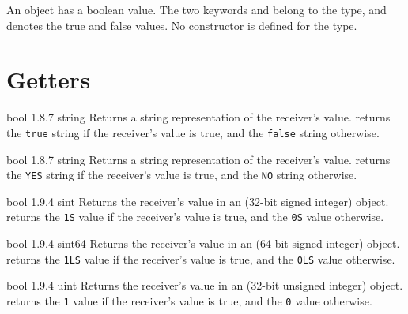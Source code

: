 

An  object has a boolean value. The two keywords  and  belong to the  type, and denotes the true and false values. No constructor is defined for the  type.

\section{Getters}

{bool}
{1.8.7}
{string}
{Returns a string representation of the receiver's value.}
{returns the \texttt{\textquotedbl true\textquotedbl} string if the receiver's value is true, and the \texttt{\textquotedbl false\textquotedbl} string otherwise.}







{bool}
{1.8.7}
{string}
{Returns a string representation of the receiver's value.}
{returns the \texttt{\textquotedbl YES\textquotedbl} string if the receiver's value is true, and the \texttt{\textquotedbl NO\textquotedbl} string otherwise.}




{bool}
{1.9.4}
{sint}
{Returns the receiver's value in an  (32-bit signed integer) object.}
{returns the \texttt{1S}  value if the receiver's value is true, and the \texttt{0S}  value otherwise.}




{bool}
{1.9.4}
{sint64}
{Returns the receiver's value in an  (64-bit signed integer) object.}
{returns the \texttt{1LS}  value if the receiver's value is true, and the \texttt{0LS}  value otherwise.}




{bool}
{1.9.4}
{uint}
{Returns the receiver's value in an  (32-bit unsigned integer) object.}
{returns the \texttt{1}  value if the receiver's value is true, and the \texttt{0}  value otherwise.}




